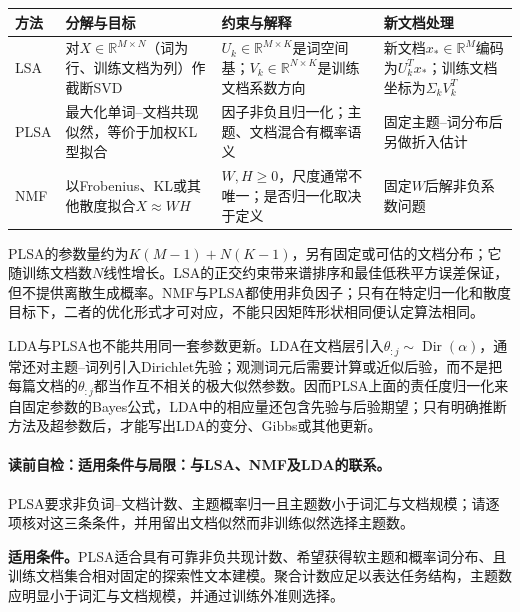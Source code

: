 \begin{comparisonbox}
\small
\begin{tabularx}{\linewidth}{@{}l X X X@{}}
\toprule 方法 & 分解与目标 & 约束与解释 & 新文档处理\\ \midrule
LSA & 对$X\in\mathbb R^{M\times N}$（词为行、训练文档为列）作截断SVD & $U_k\in\mathbb R^{M\times K}$是词空间基；$V_k\in\mathbb R^{N\times K}$是训练文档系数方向 & 新文档$x_*\in\mathbb R^M$编码为$U_k^Tx_*$；训练文档坐标为$\Sigma_kV_k^T$\\
PLSA & 最大化单词--文档共现似然，等价于加权KL型拟合 & 因子非负且归一化；主题、文档混合有概率语义 & 固定主题--词分布后另做折入估计\\
NMF & 以Frobenius、KL或其他散度拟合$X\approx WH$ & $W,H\ge0$，尺度通常不唯一；是否归一化取决于定义 & 固定$W$后解非负系数问题\\
\bottomrule
\end{tabularx}
\end{comparisonbox}

PLSA的参数量约为$K(M-1)+N(K-1)$，另有固定或可估的文档分布；它随训练文档数$N$线性增长。LSA的正交约束带来谱排序和最佳低秩平方误差保证，但不提供离散生成概率。NMF与PLSA都使用非负因子；只有在特定归一化和散度目标下，二者的优化形式才可对应，不能只因矩阵形状相同便认定算法相同。

LDA与PLSA也不能共用同一套参数更新。LDA在文档层引入$\theta_{:j}\sim\operatorname{Dir}(\alpha)$，通常还对主题--词列引入Dirichlet先验；观测词元后需要计算或近似后验，而不是把每篇文档的$\theta_{:j}$都当作互不相关的极大似然参数。因而PLSA上面的责任度归一化来自固定参数的Bayes公式，LDA中的相应量还包含先验与后验期望；只有明确推断方法及超参数后，才能写出LDA的变分、Gibbs或其他更新。

\label{struct:V4-C06-CH28}
\paragraph{读前自检：适用条件与局限：与LSA、NMF及LDA的联系。}PLSA要求非负词--文档计数、主题概率归一且主题数小于词汇与文档规模；请逐项核对这三条条件，并用留出文档似然而非训练似然选择主题数。\par

\begin{applicabilitybox}
\textbf{适用条件。}PLSA适合具有可靠非负共现计数、希望获得软主题和概率词分布、且训练文档集合相对固定的探索性文本建模。聚合计数应足以表达任务结构，主题数应明显小于词汇与文档规模，并通过训练外准则选择。
\end{applicabilitybox}

